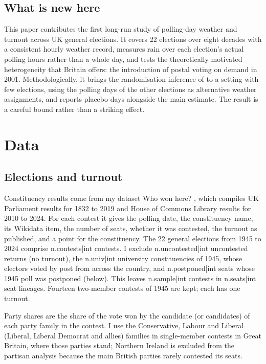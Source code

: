 \documentclass[11pt,a4paper]{article}
\begin{document}
\subsection{What is new here}
This paper contributes the first long-run study of polling-day weather and turnout across UK general elections. It covers 22 elections over eight decades with a consistent hourly weather record, measures rain over each election's actual polling hours rather than a whole day, and tests the theoretically motivated heterogeneity that Britain offers: the introduction of postal voting on demand in 2001. Methodologically, it brings the randomisation inference of \citet{cooperman2017} to a setting with few elections, using the polling days of the other elections as alternative weather assignments, and reports placebo days alongside the main estimate. The result is a careful bound rather than a striking effect.

\section{Data}\label{sec:data}
\subsection{Elections and turnout}
Constituency results come from my dataset Who won here? \citep{hotham2026ele}, which compiles UK Parliament results for 1832 to 2019 and House of Commons Library results for 2010 to 2024. For each contest it gives the polling date, the constituency name, its Wikidata item, the number of seats, whether it was contested, the turnout as published, and a point for the constituency. The 22 general elections from 1945 to 2024 comprise {{n.contests|int}} contests. I exclude {{n.uncontested|int}} uncontested returns (no turnout), the {{n.univ|int}} university constituencies of 1945, whose electors voted by post from across the country, and {{n.postponed|int}} seats whose 1945 poll was postponed (below). This leaves {{n.sample|int}} contests in {{n.seats|int}} seat lineages. Fourteen two-member contests of 1945 are kept; each has one turnout.

Party shares are the share of the vote won by the candidate (or candidates) of each party family in the contest. I use the Conservative, Labour and Liberal (Liberal, Liberal Democrat and allies) families in single-member contests in Great Britain, where those parties stand; Northern Ireland is excluded from the partisan analysis because the main British parties rarely contested its seats.
\end{document}
